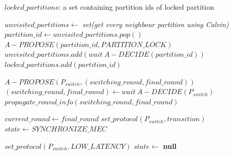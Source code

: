 \documentclass[a4paper, 10pt]{article}
\newcommand{\PE}{Calvin}
\begin{document}
\begin{algorithmic}[1]
    \Variables
        \State $locked\_partitions$: a set containing partition ids of locked partition
    \EndVariables

    \State $unvisited\_partitions \gets $ \textit{set(get every neighbour partition using \PE{})}
           \State $partition\_id \gets unvisited\_partitions.pop()$
           \State $A-PROPOSE(partition\_id, PARTITION\_LOCK)$
           \State $unvisited\_partitions.add(wait\ A-DECIDE(partition\_id))$
           \State $locked\_partitions.add(partition\_id)$
       \EndWhile
    \EndUpon

        \State $A-PROPOSE(P_{switch}, (switching\_round, final\_round))$
        \State $(switching\_round, final\_round) \gets wait\ A-DECIDE(P_{switch})$
        \State $propagate\_round\_info(switching\_round, final\_round)$
    \EndUpon

        \State $current\_round \gets final\_round$
        \State $set\_protocol(P_{switch}, transition)$
        \State $state \gets SYNCHRONIZE\_MEC$
    \EndUpon

        \State $set\_protocol(P_{switch}, LOW\_LATENCY)$
        \State $state \gets$ \textbf{null} \label{alg:line:calvin_1:switch:end}
    \EndUpon
\end{algorithmic}
\end{document}
